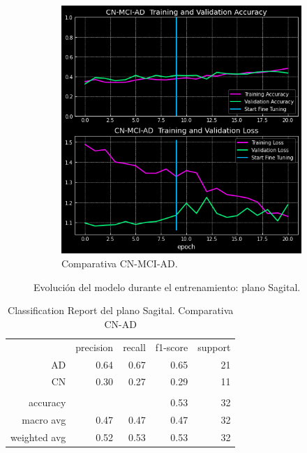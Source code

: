 \begin{figure}[H]
\begin{subfigure}{0.4\textwidth}
        \includegraphics[width=\textwidth]{./imgs/resultados/sagittal/CN_MCI_AD_output_SAGITTAL}
        \caption{Comparativa CN-MCI-AD. }
        \label{fig:sagital-c-mci-ad}
    \end{subfigure}
    \caption{Evolución del modelo durante el entrenamiento: plano Sagital.} \label{fig:sagittal-model}
\end{figure}

\begin{table}[H]
    \centering
    \begin{tabular}{r r r r r}
        & precision & recall & f1-score & support \\
        AD & 0.64 & 0.67 & 0.65 & 21 \\
        CN & 0.30 & 0.27 & 0.29 & 11 \\
        & & & & \\
        accuracy &  &  & 0.53 & 32 \\
        macro avg & 0.47 & 0.47 & 0.47 & 32 \\
        weighted avg & 0.52 & 0.53 & 0.53 & 32 \\
    \end{tabular}
    \caption{Classification Report del plano Sagital. Comparativa CN-AD}
    \label{tab:cr-sagital-cn-ad}
\end{table}

